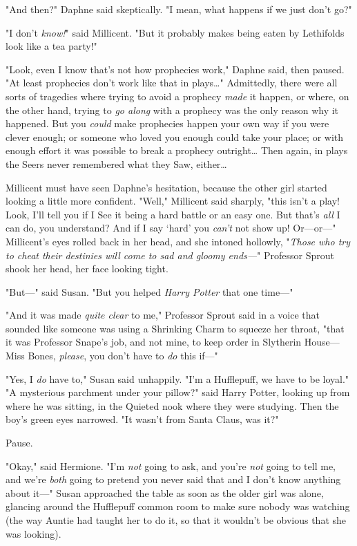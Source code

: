 "And then?" Daphne said skeptically. "I mean, what happens if we just don't go?"

"I don't \emph{know!}" said Millicent. "But it probably makes being eaten by 
Lethifolds look like a tea party!"

"Look, even I know that's not how prophecies work," Daphne said, then paused. 
"At least prophecies don't work like that in plays{\ldots}" Admittedly, there 
were all sorts of tragedies where trying to avoid a prophecy \emph{made} it 
happen, or where, on the other hand, trying to \emph{go along} with a prophecy 
was the only reason why it happened. But you \emph{could} make prophecies 
happen your own way if you were clever enough; or someone who loved you enough 
could take your place; or with enough effort it was possible to break a 
prophecy outright{\ldots} Then again, in plays the Seers never remembered what 
they Saw, either{\ldots}

Millicent must have seen Daphne's hesitation, because the other girl started 
looking a little more confident. "Well," Millicent said sharply, "this isn't a 
play! Look, I'll tell you if I See it being a hard battle or an easy one. But 
that's \emph{all} I can do, you understand? And if I say `hard' you 
\emph{can't} not show up! Or---or---" Millicent's eyes rolled back in her head, 
and she intoned hollowly, "\emph{Those who try to cheat their destinies will 
come to sad and gloomy ends---}"
\sbreak
Professor Sprout shook her head, her face looking tight.

"But---" said Susan. "But you helped \emph{Harry Potter} that one time---"

"And it was made \emph{quite clear} to me," Professor Sprout said in a voice 
that sounded like someone was using a Shrinking Charm to squeeze her throat, 
"that it was Professor Snape's job, and not mine, to keep order in Slytherin 
House---Miss Bones, \emph{please}, you don't have to \emph{do} this if---"

"Yes, I \emph{do} have to," Susan said unhappily. "I'm a Hufflepuff, we have to 
be loyal."
\sbreak
"A mysterious parchment under your pillow?" said Harry Potter, looking up from 
where he was sitting, in the Quieted nook where they were studying. Then the 
boy's green eyes narrowed. "It wasn't from Santa Claus, was it?"

Pause.

"Okay," said Hermione. "I'm \emph{not} going to ask, and you're \emph{not} 
going to tell me, and we're \emph{both} going to pretend you never said that 
and I don't know anything about it---"
\sbreak
Susan approached the table as soon as the older girl was alone, glancing around 
the Hufflepuff common room to make sure nobody was watching (the way Auntie had 
taught her to do it, so that it wouldn't be obvious that she was looking).

